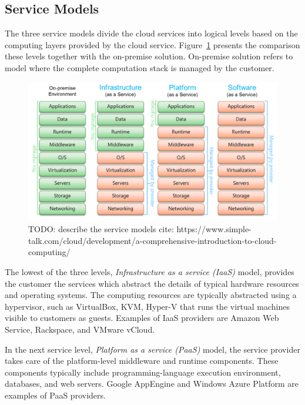 \subsection{Service Models}
The three service models divide the cloud services into logical levels based on the computing layers provided by the cloud service. Figure~\ref{fig:cloud-computing-service-models} presents the comparison these levels together with the on-premise solution. On-premise solution refers to model where the complete computation stack is managed by the customer.

\begin{figure}[]
  \begin{center}
    \includegraphics[width=\textwidth]{images/cloud-computing-service-models.png}
    \caption{TODO: describe the service models cite: https://www.simple-talk.com/cloud/development/a-comprehensive-introduction-to-cloud-computing/}
    \label{fig:cloud-computing-service-models}
  \end{center}
\end{figure}

The lowest of the three levels, \emph{Infrastructure as a service (IaaS)} model, provides the customer the services which abstract the details of typical hardware resources and operating systems. The computing resources are typically abstracted using a hypervisor, such as VirtualBox, KVM, Hyper-V that runs the virtual machines visible to customers as guests. Examples of IaaS providers are Amazon Web Service, Rackspace, and VMware vCloud.

In the next service level, \emph{Platform as a service (PaaS)} model, the service provider takes care of the platform-level middleware and runtime components. These components typically include programming-language execution environment, databases, and web servers. Google AppEngine and Windows Azure Platform are examples of PaaS providers.

